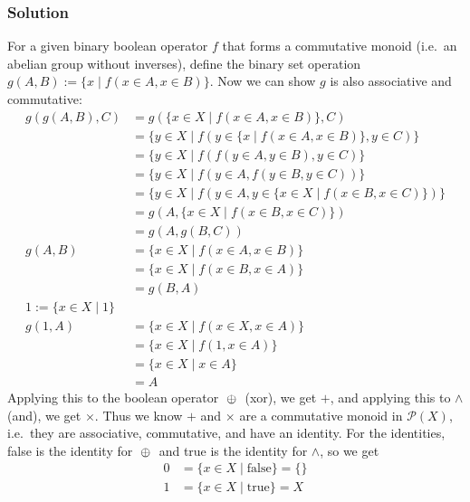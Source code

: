 \documentclass[fleqn]{article}
\newcommand*\xor{\thickspace \oplus \thickspace}
\begin{document}
            \subsubsection{Solution}
            For a given binary boolean operator $f$ that forms a commutative monoid (i.e.\ an abelian group without inverses), define the binary set operation $g(A, B) := \{x \mid f(x \in A, x \in B)\}$.  Now we can show $g$ is also associative and commutative:
            \begin{align}
                g(g(A, B), C) &= g(\{x \in X \mid f(x \in A, x \in B)\}, C) \\
                    &= \{y \in X \mid f(y \in \{x \mid f(x \in A, x \in B)\}, y \in C)\} \\
                    &= \{y \in X \mid f(f(y \in A, y \in B), y \in C)\} \\
                    &= \{y \in X \mid f(y \in A, f(y \in B, y \in C))\} \\
                    &= \{y \in X \mid f(y \in A, y \in \{x \in X \mid f(x \in B, x \in C)\})\} \\
                    &= g(A, \{x \in X \mid f(x \in B, x \in C)\}) \\
                    &= g(A, g(B, C)) \\
                g(A, B) &= \{x \in X \mid f(x \in A, x \in B)\} \\
                    &= \{x \in X \mid f(x \in B, x \in A)\} \\
                    &= g(B, A) \\
                1 := \{x \in X \mid 1\} \\
                g(1, A) &= \{x \in X \mid f(x \in X, x \in A)\} \\
                    &= \{x \in X \mid f(1, x \in A)\} \\
                    &= \{x \in X \mid x \in A\} \\
                    &= A
            \end{align}
            Applying this to the boolean operator $\xor$ (xor), we get $+$, and applying this to $\land$ (and), we get $\times$.  Thus we know $+$ and $\times$ are a commutative monoid in $\mathcal{P}(X)$, i.e.\ they are associative, commutative, and have an identity.  For the identities, false is the identity for $\xor$ and true is the identity for $\land$, so we get
            \begin{align}
                0 &= \{x \in X \mid \text{false}\} = \{\} \\
                1 &= \{x \in X \mid \text{true}\} = X
            \end{align}
\end{document}
